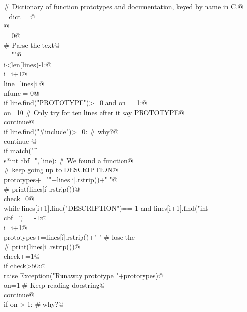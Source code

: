 \documentclass[10pt,a4paper,twoside,notitlepage]{article}
\begin{document}
\begin{flushleft}
\begin{minipage}{\linewidth}
\begin{list}{}{}
\mbox{}\verb@# Dictionary of function prototypes and documentation, keyed by name in C.@\\
\mbox{}\verb@name_dict = {}@\\
\mbox{}@\\
\mbox{}\verb@debug = 0@\\
\mbox{}\verb@# Parse the text@\\
\mbox{}\verb@prototypes = ""@\\
\mbox{}\verb@while i<len(lines)-1:@\\
\mbox{}\verb@   i=i+1@\\
\mbox{}\verb@   line=lines[i]@\\
\mbox{}\verb@   nfunc = 0@\\
\mbox{}\verb@   if line.find("PROTOTYPE")>=0 and on==1:@\\
\mbox{}\verb@      on=10 # Only try for ten lines after it say PROTOTYPE@\\
\mbox{}\verb@      continue@\\
\mbox{}\verb@   if line.find("#include")>=0: # why?@\\
\mbox{}\verb@      continue @\\
\mbox{}\verb@   if match("^\\s*int cbf_", line): # We found a function@\\
\mbox{}\verb@      # keep going up to DESCRIPTION@\\
\mbox{}\verb@      prototypes+=""+lines[i].rstrip()+" "@\\
\mbox{}\verb@      # print(lines[i].rstrip())@\\
\mbox{}\verb@      check=0@\\
\mbox{}\verb@      while lines[i+1].find("DESCRIPTION")==-1 and lines[i+1].find("int cbf_")==-1:@\\
\mbox{}\verb@         i=i+1@\\
\mbox{}\verb@         prototypes+=lines[i].rstrip()+" " # lose the \n@\\
\mbox{}\verb@         # print(lines[i].rstrip())@\\
\mbox{}\verb@         check+=1@\\
\mbox{}\verb@         if check>50:@\\
\mbox{}\verb@            raise Exception("Runaway prototype "+prototypes)@\\
\mbox{}\verb@      on=1 # Keep reading docstring@\\
\mbox{}\verb@      continue@\\
\mbox{}\verb@   if on > 1: # why?@\\

\end{list}
\end{minipage}
\end{flushleft}
\end{document}

